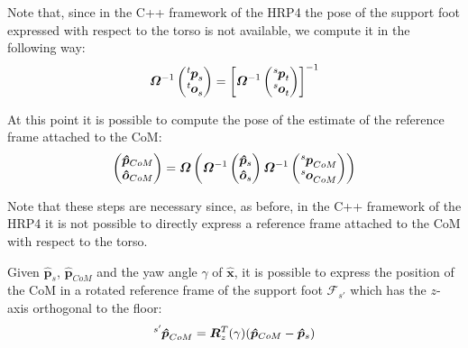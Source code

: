 \documentclass[a4paper]{article}
\begin{document}
Note that, since in the C++ framework of the HRP4 the pose of the support foot
expressed with respect to the torso is not available, we compute it in the
following way:
\begin{equation}
    \bm{\varOmega}^{-1}
    \begin{pmatrix}
        \tensor[^t]{\bm{p}}{_s} \\
        \tensor[^t]{\bm{o}}{_s}
    \end{pmatrix} =
    \left[\bm{\varOmega}^{-1}
    \begin{pmatrix}
        \tensor[^s]{\bm{p}}{_t} \\
        \tensor[^s]{\bm{o}}{_t}
    \end{pmatrix}\right]^{-1}
\end{equation}

At this point it is possible to compute the pose of the estimate of the
reference frame attached to the CoM:
\begin{equation}
    \label{eq:pose-rf-com-world}
    \begin{pmatrix}
        \bm{\hat{p}}_{CoM} \\
        \bm{\hat{o}}_{CoM}
    \end{pmatrix} = \bm{\varOmega}\left(\bm{\varOmega}^{-1}
        \begin{pmatrix}
            \bm{\hat{p}}_s \\
            \bm{\hat{o}}_s
        \end{pmatrix}\bm{\varOmega}^{-1}
        \begin{pmatrix}
            \tensor[^s]{\bm{p}}{_{CoM}} \\
            \tensor[^s]{\bm{o}}{_{CoM}}
        \end{pmatrix}
    \right)
\end{equation}

Note that these steps are necessary since, as before, in the C++ framework of the
HRP4 it is not possible to directly express a reference frame attached to the CoM with
respect to the torso.

Given $\bm{\hat{p}}_{s}$, $\bm{\hat{p}}_{CoM}$ and the yaw angle $\gamma$ of
$\bm{\hat{x}}$, it is possible to express the position of the CoM in a rotated
reference frame of the support foot $\mathcal{F}_{s'}$ which has the $z$-axis
orthogonal to the floor:
\begin{equation}
    \tensor[^{s'}]{\bm{\hat{p}}}{_{CoM}} = \bm{R}^{T}_{z}(\gamma)(\bm{\hat{p}}_{CoM}-\bm{\hat{p}}_{s})
\end{equation}
\end{document}
